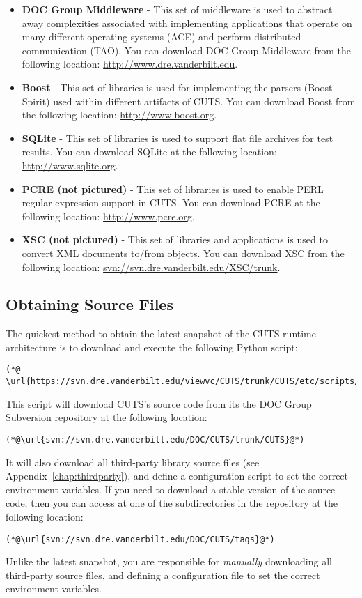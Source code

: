 \begin{itemize} 
  \item \textbf{DOC Group Middleware} - This set of middleware is used to abstract 
  away complexities associated with implementing applications that operate on many 
  different operating systems (ACE) and perform distributed communication (TAO). 
  You can download DOC Group Middleware from the following location: 
  \url{http://www.dre.vanderbilt.edu}.

  \item \textbf{Boost} - This set of libraries is used for implementing the parsers 
  (Boost Spirit) used within different artifacts of CUTS. You can download Boost from
  the following location: \url{http://www.boost.org}.

  \item \textbf{SQLite} - This set of libraries is used to support flat file archives
  for test results. You can download SQLite at the following location: 
  \url{http://www.sqlite.org}.

  \item \textbf{PCRE (not pictured)} - This set of libraries is used to enable PERL 
  regular expression support in CUTS. You can download PCRE at the following location:
  \url{http://www.pcre.org}.

  \item \textbf{XSC (not pictured)} - This set of libraries and applications is used to 
  convert XML documents to/from objects. You can download XSC from the following location: 
  \url{svn://svn.dre.vanderbilt.edu/XSC/trunk}.
\end{itemize}

\subsection{Obtaining Source Files}
\label{sec:install-download-runtime}

The quickest method to obtain the latest snapshot of the CUTS
runtime architecture is to download and execute the following
Python script:
\begin{lstlisting} 
(*@
\url{https://svn.dre.vanderbilt.edu/viewvc/CUTS/trunk/CUTS/etc/scripts/download_sources.py}@*)
\end{lstlisting}
This script will download CUTS's source code from its the 
DOC Group Subversion repository at the following location:
\begin{lstlisting}
(*@\url{svn://svn.dre.vanderbilt.edu/DOC/CUTS/trunk/CUTS}@*)
\end{lstlisting}
It will also download all third-party library source files
(see Appendix~\ref{chap:thirdparty}), and define a configuration
script to set the correct environment variables.
If you need to download a stable version of the source code, then 
you can access at one of the subdirectories in the repository at 
the following location:
\begin{lstlisting}
(*@\url{svn://svn.dre.vanderbilt.edu/DOC/CUTS/tags}@*)
\end{lstlisting}
Unlike the latest snapshot, you are responsible for \textit{manually}
downloading all third-party source files, and defining a configuration
file to set the correct environment variables.

